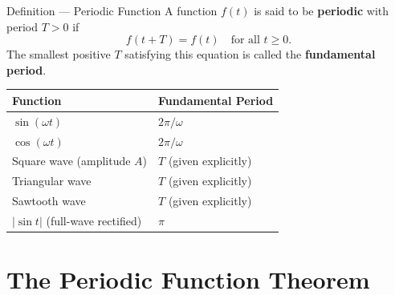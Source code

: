 \documentclass[12pt,a4paper]{article}
\begin{document}
\begin{infobox}{Definition --- Periodic Function}
A function $f(t)$ is said to be \textbf{periodic} with period $T > 0$ if
\[
  f(t + T) = f(t) \quad \text{for all } t \geq 0.
\]
The smallest positive $T$ satisfying this equation is called the
\textbf{fundamental period}.

\medskip
\begin{center}
\begin{tabular}{ll}
\toprule
Function & Fundamental Period \\
\midrule
$\sin(\omega t)$ & $2\pi/\omega$ \\
$\cos(\omega t)$ & $2\pi/\omega$ \\
Square wave (amplitude $A$) & $T$ (given explicitly) \\
Triangular wave & $T$ (given explicitly) \\
Sawtooth wave & $T$ (given explicitly) \\
$|\sin t|$ (full-wave rectified) & $\pi$ \\
\bottomrule
\end{tabular}
\end{center}
\end{infobox}

\section{The Periodic Function Theorem}
\end{document}

